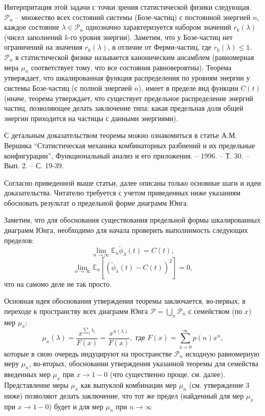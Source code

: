 \begin{problem}
Интерпритация этой задачи с точки зрения статистической физики следующая.  $\mathcal P_n $ -- множество всех состояний системы (Бозе-частиц) 
с постоянной энергией $n$, каждое состояние $\lambda \in \mathcal P_n $ однозначно 
характеризуется набором значений $r_k (\lambda )$ (чисел заполнений $k$-го 
уровня энергии). Заметим, что у Бозе-частиц нет ограничений на значения $r_k 
(\lambda )$, в отличие от Ферми-частиц, где $r_k (\lambda )\le 1$. $\mathcal P_n $ в 
статистической физике называется каноническим ансамблем (равномерная 
мера $\mu _n $ соответствует тому, что все состояния равновероятны). Теорема утверждает, что  шкалированная функция распределения по уровням энергии у системы Бозе-частиц (с полной энергией $n$),  имеет в пределе вид функции $C(t)$ (иначе, теорема утверждает, что существует предельное распределение энергий частиц, позволяющее делать заключение типа: какая предельная
доля общей энергии приходится на частицы с данными энергиями).

\begin{remark}
С детальным доказательством теоремы можно ознакомиться в статье А.М. Вершика ``Статистическая механика комбинаторных разбиений и их предельные конфигурации'', Функциональный анализ и его приложения. -- 1996. -- Т. 30. -- Вып. 2. -- С. 19-39.
\end{remark}

Согласно приведенной выше статьи, далее описаны только основные шаги и идеи доказательства. Читателю требуется с учетом приведенных ниже указаниям обосновать результат о предельной форме диаграмм Юнга.

\begin{ordre} Заметим, что для обоснования существования предельной формы шкалированных диаграмм Юнга, необходимо для начала проверить выполнимость следующих пределов:
$$
\mathop {\lim }\limits_{n\to 
\infty } \mathbb E_{n}\tilde {\phi }_\lambda (t) = C(t),
$$
$$\mathop {\lim }\limits_{n\to 
\infty }\mathbb E_{n } \left[ {\left( {\tilde {\phi }_\lambda (t)-C(t)} 
\right)^2} \right]=0,$$
что на самомо деле не так просто.

Основная идея обоснования утверждения теоремы заключается, во-первых, в переходе к пространству всех диаграмм Юнга $\mathcal P=\bigcup\limits_n {\mathcal P_n} $ с семейством (по $x$) мер $\mu _x $:
$$\mu _x (\lambda )=\frac{x^{\sum\limits_i {\lambda _i } 
}}{F(x)}=\frac{x^{n(\lambda )}}{F(x)}, \text{ где } F(x)=\sum\limits_{n=0}^\infty 
{p(n)x^n},$$
которые в свою очередь индуцируют на пространстве $\mathcal P_n $ исходную равномерную меру  $\mu _n $,
во-вторых, обосновании утверждения указанной теоремы для семейства введенных мер $\mu _x $ при $x \to 1-0$ (что существенно проще, см. далее). Представление меры $\mu_x$ как выпуклой комбинации мер $\mu_n$ (см. утверждение 3 ниже) позволяют делать заключение, что тот же предел (найденный для мер  $\mu _x $ при $x \to 1-0$) будет и для мер $\mu _n $ при $n \to \infty$


\end{ordre}
\end{problem}
